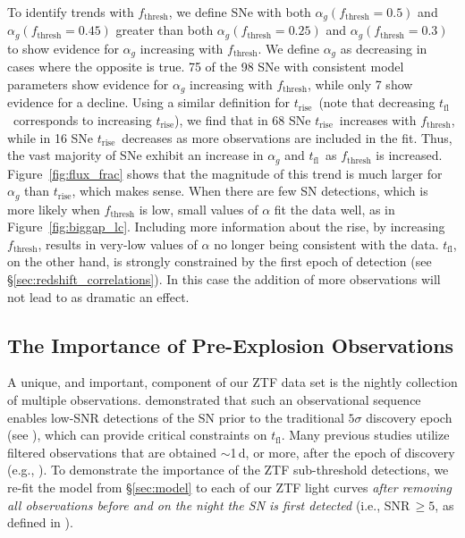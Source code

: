 \documentclass[twocolumn]{aastex63}
\newcommand{\tfl}{$t_\mathrm{fl}$}
\newcommand{\trise}{$t_\mathrm{rise}$}
\begin{document}
To identify trends with $f_\mathrm{thresh}$, we define SNe with both
$\alpha_g(f_\mathrm{thresh} = 0.5)$ and $\alpha_g(f_\mathrm{thresh} = 0.45)$
greater than both $\alpha_g(f_\mathrm{thresh} = 0.25)$ and
$\alpha_g(f_\mathrm{thresh} = 0.3)$ to show evidence for $\alpha_g$ increasing
with $f_\mathrm{thresh}$. We define $\alpha_g$ as decreasing in cases where
the opposite is true. 75 of the 98 SNe with consistent model parameters show
evidence for $\alpha_g$ increasing with $f_\mathrm{thresh}$, while only 7 show
evidence for a decline. Using a similar definition for \trise\ (note that
decreasing \tfl\ corresponds to increasing \trise), we find that in 68 SNe
\trise\ increases with $f_\mathrm{thresh}$, while in 16 SNe \trise\ decreases
as more observations are included in the fit. Thus, the vast majority of SNe
exhibit an increase in $\alpha_g$ and \tfl\ as $f_\mathrm{thresh}$ is
increased. Figure~\ref{fig:flux_frac} shows that the magnitude of this trend
is much larger for $\alpha_g$ than \trise, which makes sense. When there are
few SN detections, which is more likely when $f_\mathrm{thresh}$ is low, small
values of $\alpha$ fit the data well, as in Figure~\ref{fig:biggap_lc}.
Including more information about the rise, by increasing $f_\mathrm{thresh}$,
results in very-low values of $\alpha$ no longer being consistent with the
data. \tfl, on the other hand, is strongly constrained by the first epoch of
detection (see \S\ref{sec:redshift_correlations}). In this case the addition
of more observations will not lead to as dramatic an effect.

\subsection{The Importance of Pre-Explosion Observations}\label{sec:pre_explosion}

A unique, and important, component of our ZTF data set is the nightly
collection of multiple observations. \citet{Yao19} demonstrated that such an
observational sequence enables low-SNR detections of the SN prior to the
traditional $5\sigma$ discovery epoch (see \citealt{Masci19}), which can
provide critical constraints on \tfl. Many previous studies utilize filtered
observations that are obtained $\sim$1\,d, or more, after the epoch of
discovery (e.g., \citealt{Riess99a,Aldering00,Ganeshalingam10,Zheng17a}). To
demonstrate the importance of the ZTF sub-threshold detections, we re-fit the
model from \S\ref{sec:model} to each of our ZTF light curves \textit{after
removing all observations before and on the night the SN is first detected}
(i.e., SNR\,$\geq 5$, as defined in \citealt{Yao19}).
\end{document}
